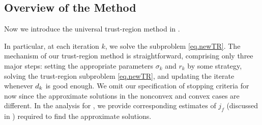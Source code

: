 \subsection{Overview of the Method}
Now we introduce the universal trust-region method in .
\begin{algorithm}[ht]
    \caption{A \textbf{U}niversal \textbf{T}rust-\textbf{R}egion Method (UTR)}\label{alg.conceptual utr}
\end{algorithm}
In particular, at each iteration $k$, we solve the subproblem \eqref{eq.newTR}. The mechanism of our trust-region method is straightforward, comprising only three major steps: setting the appropriate parameters $\sigma_k$ and $r_k$ by some strategy, solving the trust-region subproblem \eqref{eq.newTR}, and updating the iterate whenever $d_k$ is good enough. We omit our specification of stopping criteria for now since the approximate solutions in the nonconvex and convex cases are different.
In the analysis for ,
we provide corresponding estimates of $j_f$ (discussed in ) required to find the approximate solutions.

